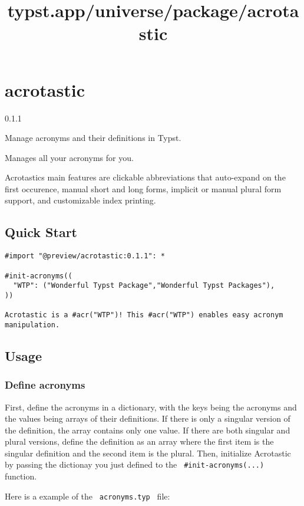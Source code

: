 \title{typst.app/universe/package/acrotastic}

\label{banner}
\section{acrotastic}\label{acrotastic}

{ 0.1.1 }

Manage acronyms and their definitions in Typst.

\label{readme}
Manages all your acronyms for you.

Acrotastics main features are clickable abbreviations that auto-expand
on the first occurence, manual short and long forms, implicit or manual
plural form support, and customizable index printing.

\subsection{Quick Start}\label{quick-start}

\begin{verbatim}
#import "@preview/acrotastic:0.1.1": *

#init-acronyms((
  "WTP": ("Wonderful Typst Package","Wonderful Typst Packages"),
))

Acrotastic is a #acr("WTP")! This #acr("WTP") enables easy acronym manipulation.
\end{verbatim}

\subsection{Usage}\label{usage}

\subsubsection{Define acronyms}\label{define-acronyms}

First, define the acronyms in a dictionary, with the keys being the
acronyms and the values being arrays of their definitions. If there is
only a singular version of the definition, the array contains only one
value. If there are both singular and plural versions, define the
definition as an array where the first item is the singular definition
and the second item is the plural. Then, initialize Acrotastic by
passing the dictionay you just defined to the
\texttt{\ \#init-acronyms(...)\ } function.

Here is a example of the \texttt{\ acronyms.typ\ } file:


